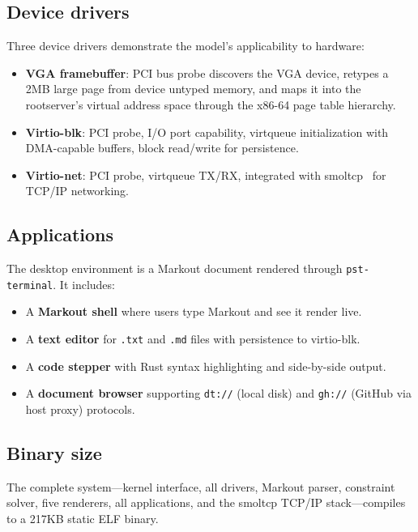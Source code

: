\documentclass[11pt,a4paper]{article}
\begin{document}
\subsection{Device drivers}

Three device drivers demonstrate the model's applicability to hardware:

\begin{itemize}
  \item \textbf{VGA framebuffer}: PCI bus probe discovers the VGA device, retypes a 2MB large page from device untyped memory, and maps it into the rootserver's virtual address space through the x86-64 page table hierarchy.
  \item \textbf{Virtio-blk}: PCI probe, I/O port capability, virtqueue initialization with DMA-capable buffers, block read/write for persistence.
  \item \textbf{Virtio-net}: PCI probe, virtqueue TX/RX, integrated with smoltcp~\citep{smoltcp} for TCP/IP networking.
\end{itemize}

\subsection{Applications}

The desktop environment is a Markout document rendered through \texttt{pst-terminal}. It includes:

\begin{itemize}
  \item A \textbf{Markout shell} where users type Markout and see it render live.
  \item A \textbf{text editor} for \texttt{.txt} and \texttt{.md} files with persistence to virtio-blk.
  \item A \textbf{code stepper} with Rust syntax highlighting and side-by-side output.
  \item A \textbf{document browser} supporting \texttt{dt://} (local disk) and \texttt{gh://} (GitHub via host proxy) protocols.
\end{itemize}

\subsection{Binary size}

The complete system---kernel interface, all drivers, Markout parser, constraint solver, five renderers, all applications, and the smoltcp TCP/IP stack---compiles to a 217KB static ELF binary.
\end{document}
